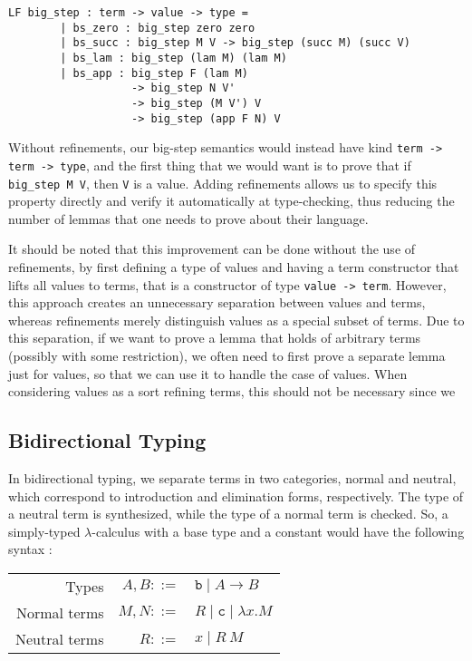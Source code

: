 \documentclass[letterpaper, 11pt]{article}
\newcommand{\rar}{\rightarrow}
\begin{document}
    \begin{lstlisting}[mathescape, basicstyle=\fontfamily{lmvtt}\selectfont]
      LF big_step : term -> value -> type =
        | bs_zero : big_step zero zero
        | bs_succ : big_step M V -> big_step (succ M) (succ V)
        | bs_lam : big_step (lam M) (lam M)
        | bs_app : big_step F (lam M) 
                   -> big_step N V' 
                   -> big_step (M V') V 
                   -> big_step (app F N) V
    \end{lstlisting}

    Without refinements, our big-step semantics would instead have kind \texttt{term -> term -> type}, and the first thing that we would want is to prove 
    that if \texttt{big\_step M V}, then \texttt{V} is a value.  Adding refinements allows us to specify this property directly and verify it automatically
    at type-checking, thus reducing the number of lemmas that one needs to prove about their language.

    It should be noted that this improvement can be done without the use of refinements, by first defining a type of values and having a term constructor 
    that lifts all values to terms, that is a constructor of type \texttt{value -> term}.  However, this approach creates an unnecessary separation between
    values and terms, whereas refinements merely distinguish values as a special subset of terms.  Due to this separation, if we want to prove a lemma that 
    holds of arbitrary terms (possibly with some restriction), we often need to first prove a separate lemma just for values, so that we can use it to handle
    the case of values.  When considering values as a sort refining terms, this should not be necessary since we 

    \subsection{Bidirectional Typing}
    
    In bidirectional typing, we separate terms in two categories, normal and neutral, which correspond to introduction and elimination forms, respectively.  
    The type of a neutral term is synthesized, while the type of a normal term is checked.  So, a simply-typed $\lambda$-calculus with a base type and a 
    constant would have the following syntax :

    \begin{center}
      \begin{tabular}{rrl}
        Types          & $A,B ::=$ & $\texttt{b} \mid A \rar B$ \\
        Normal terms   & $M,N ::=$ & $R \mid \texttt{c} \mid \lambda x. M$ \\
        Neutral terms  & $R ::=$   & $x \mid R \ M$
      \end{tabular}
    \end{center}
\end{document}
